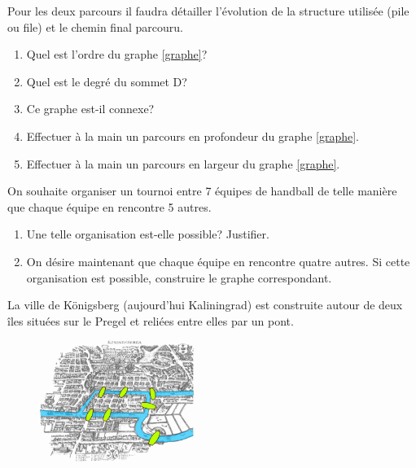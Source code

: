 \documentclass[a4paper,11pt]{article}
\begin{document}
\begin{Form}
\begin{exo}
\begin{center}
\label{graphe}
\end{center}
Pour les deux parcours il faudra détailler l'évolution de la structure utilisée (pile ou file) et le chemin final parcouru.
\begin{enumerate}
\item Quel est l'ordre du graphe \ref{graphe}?
\item Quel est le degré du sommet D?
\item Ce graphe est-il connexe?
\item Effectuer à la main un parcours en profondeur du graphe \ref{graphe}.
\item Effectuer à la main un parcours en largeur du graphe \ref{graphe}.
\end{enumerate}
\end{exo}
\begin{exo}
On souhaite organiser un tournoi entre 7 équipes de handball de telle manière que chaque équipe en rencontre 5 autres.
\begin{enumerate}
\item Une telle organisation est-elle possible? Justifier.
\item On désire maintenant que chaque équipe en rencontre quatre autres. Si cette organisation est possible, construire le graphe correspondant.
\end{enumerate}
\end{exo}
\begin{exo}
La ville de Königsberg (aujourd'hui Kaliningrad) est construite autour de deux îles situées sur le Pregel et reliées entre elles par un pont.
\begin{figure}[!h]
\centering
\includegraphics[width=5cm]{ressources/pont-konisberg.png}
\label{pont}
\end{figure}


\end{exo}
\end{Form}
\end{document}
